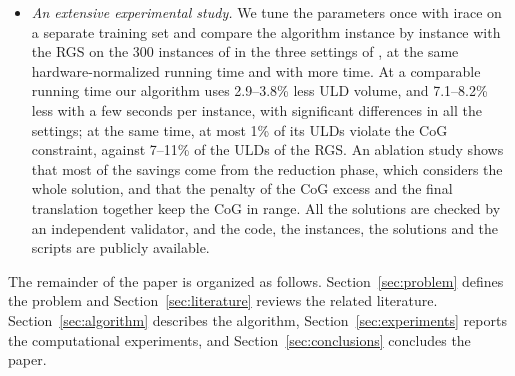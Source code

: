 \begin{itemize}
	loaded in a ULD are given priority inside BSG, and the construction is restarted with
	priority to the boxes left out.
\item \emph{An extensive experimental study.} We tune the parameters once with irace
	\citep{LopezIbanez2016} on a separate training set and compare the algorithm instance by
	instance with the RGS on the 300 instances of \citet{Paquay2018b} in the three settings of
	\citet{Hessler2025}, at the same hardware-normalized running time and with more time. At a
	comparable running time our algorithm uses 2.9--3.8\% less ULD volume, and 7.1--8.2\% less
	with a few seconds per instance, with significant differences in all the settings; at the
	same time, at most 1\% of its ULDs violate the CoG constraint, against 7--11\% of the ULDs of
	the RGS. An ablation study shows that most of the savings come from the reduction phase,
	which considers the whole solution, and that the penalty of the CoG excess and the final
	translation together keep the CoG in range. All the solutions are checked by an independent
	validator, and the code, the instances, the solutions and the scripts are publicly
	available.
\end{itemize}

The remainder of the paper is organized as follows. Section~\ref{sec:problem} defines the
problem and Section~\ref{sec:literature} reviews the related literature.
Section~\ref{sec:algorithm} describes the algorithm, Section~\ref{sec:experiments} reports the
computational experiments, and Section~\ref{sec:conclusions} concludes the paper.
